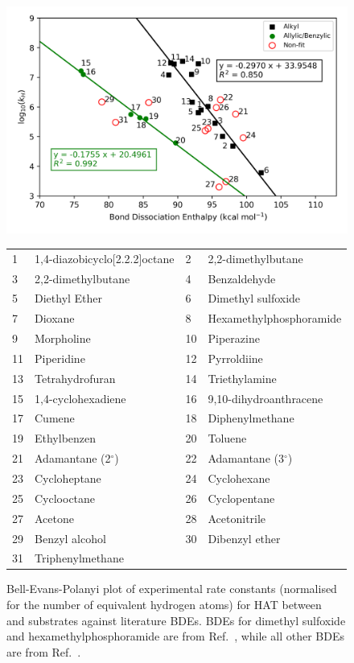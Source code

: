\begin{figure}[!htbp]
  \centering
  \includegraphics[width=\textwidth]{figures/bep-expt}
\begin{tabularx}{\textwidth}{| l X l X |}
  \hline
  1 & 1,4-diazobicyclo[2.2.2]octane & 2 & 2,2-dimethylbutane \\
  3 & 2,2-dimethylbutane & 4 & Benzaldehyde \\
  5 & Diethyl Ether & 6 & Dimethyl sulfoxide \\
  7 & Dioxane & 8 & Hexamethylphosphoramide \\
  9 & Morpholine & 10 & Piperazine \\
  11 & Piperidine & 12 & Pyrroldiine \\
  13 & Tetrahydrofuran & 14 & Triethylamine \\
  15 & 1,4-cyclohexadiene & 16 & 9,10-dihydroanthracene \\
  17 & Cumene & 18 & Diphenylmethane \\
  19 & Ethylbenzen & 20 & Toluene \\
  21 & Adamantane (2$^\circ$) & 22 & Adamantane (3$^\circ$) \\
  23 & Cycloheptane & 24 & Cyclohexane \\
  25 & Cyclooctane & 26 & Cyclopentane  \\
  27 & Acetone & 28 & Acetonitrile \\
  29 & Benzyl alcohol & 30 & Dibenzyl ether \\
  31 & Triphenylmethane & & \\
  \hline
\end{tabularx}
  \caption[Bell-Evans-Polanyi plot of experimental rate constants against literature BDEs.]{Bell-Evans-Polanyi plot of experimental rate constants (normalised for the number of equivalent hydrogen atoms) for HAT between \cumo~ and substrates against literature BDEs. BDEs for dimethyl sulfoxide and hexamethylphosphoramide are from Ref.~\protect{}, while all other BDEs are from Ref.~\protect{}.}
\label{fig:bep-expt}
\end{figure}

